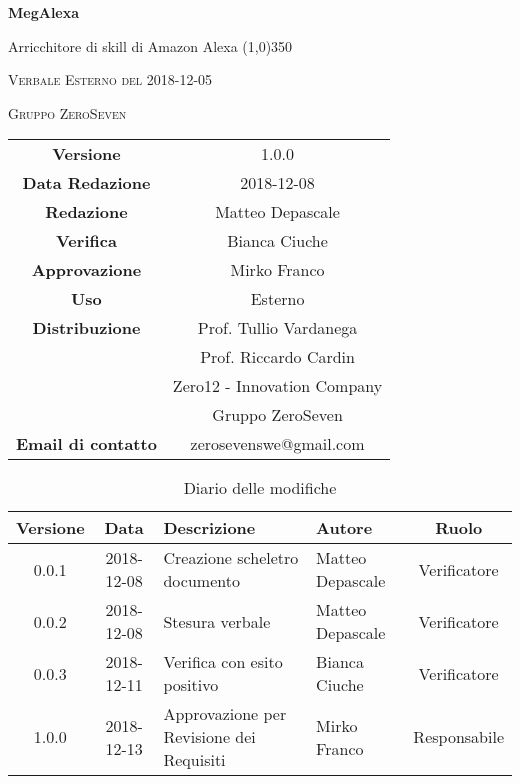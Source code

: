 \documentclass[a4paper,12pt]{article}
\author{Matteo Depascale}
\date{2018-12-08}
\begin{document}
\begin{titlepage}
	\centering
	{\huge\bfseries MegAlexa\par}
	Arricchitore di skill di Amazon Alexa
	\line(1,0){350} \\
	{\scshape\LARGE Verbale Esterno del 2018-12-05 \par}
	\vspace{1cm}
	{\scshape Gruppo ZeroSeven \par}
	\logo
	\begin{tabular}{c|c}
		{\hfill \textbf{Versione}} 			& 1.0.0				\\
		{\hfill\textbf{Data Redazione}} 	& 2018-12-08		\\ 
		{\hfill\textbf{Redazione}} 			&  		Matteo Depascale			\\ 
		{\hfill\textbf{Verifica}} 				&  		Bianca Ciuche		\\ 
		{\hfill\textbf{Approvazione}} 		&  		Mirko Franco	\\ 
		{\hfill\textbf{Uso}} 					& 	Esterno	\\ 
		{\hfill\textbf{Distribuzione}} 			& 			Prof. Tullio Vardanega \\ & Prof. Riccardo Cardin \\ & Zero12 - Innovation Company \\ & Gruppo ZeroSeven		\\ 
		{\hfill\textbf{Email di contatto}} & zerosevenswe@gmail.com \\
	\end{tabular}
\end{titlepage}
	

	
	\label{LastFrontPage}
	

	\newpage
	\cleardoublepage
		\begin{table}[tbph]
		\centering
		\begin{tabularx}{\textwidth}{|c|c|X|X|c|}
			\hline
			\textbf{Versione} & \textbf{Data} & \textbf{Descrizione} & \textbf{Autore} & \textbf{Ruolo} \\
			\hline
			0.0.1 & 2018-12-08 & Creazione scheletro documento
			& Matteo Depascale & Verificatore\\
			\hline
			0.0.2 & 2018-12-08 & Stesura verbale & Matteo Depascale & Verificatore \\
			\hline
			0.0.3 & 2018-12-11 & Verifica con esito positivo & Bianca Ciuche & Verificatore \\
			\hline
			1.0.0 & 2018-12-13 & Approvazione per Revisione dei Requisiti & Mirko Franco & Responsabile \\
			\hline
		\end{tabularx}
		\caption{Diario delle modifiche}
	\end{table}
	
\end{document}
